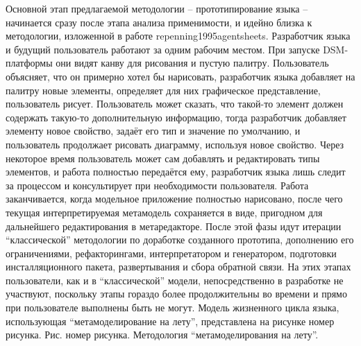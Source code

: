 Основной этап предлагаемой методологии – прототипирование языка – начинается сразу после этапа анализа применимости, и идейно близка к методологии, изложенной в работе repenning1995agentsheets. Разработчик языка и будущий пользователь работают за одним рабочим местом. При запуске DSM-платформы они видят канву для рисования и пустую палитру. Пользователь объясняет, что он примерно хотел бы нарисовать, разработчик языка добавляет на палитру новые элементы, определяет для них графическое представление, пользователь рисует. Пользователь может сказать, что такой-то элемент должен содержать такую-то дополнительную информацию, тогда разработчик добавляет элементу новое свойство, задаёт его тип и значение по умолчанию, и пользователь продолжает рисовать диаграмму, используя новое свойство. Через некоторое время пользователь может сам добавлять и редактировать типы элементов, и работа полностью передаётся ему, разработчик языка лишь следит за процессом и консультирует при необходимости пользователя. Работа заканчивается, когда модельное приложение полностью нарисовано, после чего текущая интерпретируемая метамодель сохраняется в виде, пригодном для дальнейшего редактирования в метаредакторе. После этой фазы идут итерации “классической” методологии по доработке созданного прототипа, дополнению его ограничениями, рефакторингами, интерпретатором и генератором, подготовки инсталляционного пакета, развертывания и сбора обратной связи. На этих этапах пользователи, как и в “классической” модели, непосредственно в разработке не участвуют, поскольку этапы гораздо более продолжительны во времени и прямо при пользователе выполнены быть не могут.
Модель жизненного цикла языка, использующая “метамоделирование на лету”, представлена на рисунке номер рисунка.
Рис. номер рисунка. Методология “метамоделирования на лету”.

